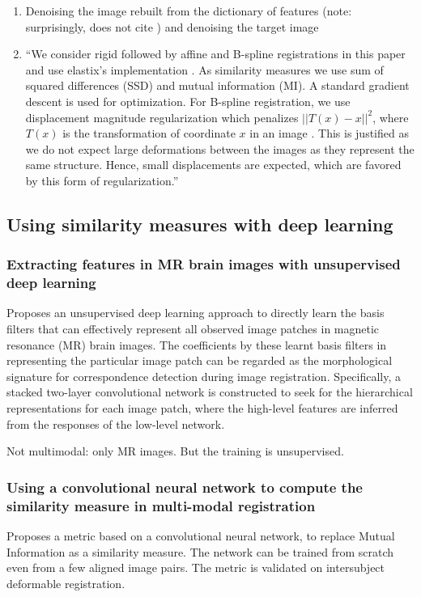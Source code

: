\documentclass[11pt]{article} %
\begin{document}
\begin{enumerate}
  \item Denoising the image rebuilt from the dictionary of features \cite{elad:denoisingdico, li:denoisingdico} (note: surprisingly, \cite{cao:analogies} does not cite \cite{li:denoisingdico}) and denoising the target image
  \item ``We consider rigid followed by affine and B-spline registrations in this paper and use elastix’s implementation \cite{klein:elastix, ibanez:itk}. As similarity measures we use sum of squared differences (SSD) and mutual information
(MI). A standard gradient descent is used for optimization. For B-spline registration, we use displacement
magnitude regularization which penalizes ${||T (x) - x||}^2$,
where $T (x)$ is the transformation of coordinate $x$ in an
image \cite{klein:elastix}. This is justified as we do not
expect large deformations between the images as they
represent the same structure. Hence, small displacements are expected, which are favored by this form of
regularization.'' \cite{cao:analogies}
\end{enumerate}

  \subsection{Using similarity measures with deep learning \cite{litjens:deeplearning}}
    \subsubsection{Extracting features in MR brain images with unsupervised deep learning \linebreak[4] \cite{wu:features} }
Proposes an unsupervised deep learning approach to directly learn the basis filters that can effectively represent all observed image patches in magnetic resonance (MR) brain images. The coefficients by these learnt basis filters in representing the particular image patch can be regarded as the morphological signature for correspondence detection during image registration. Specifically, a stacked two-layer convolutional network is constructed to seek for the hierarchical representations for each image patch, where the high-level features are inferred from the responses of the low-level network.

Not multimodal: only MR images. But the training is unsupervised.

    \subsubsection{Using a convolutional neural network to compute the similarity measure in multi-modal registration \cite{simonovsky:crossmodalfeatures}}
Proposes a metric based on a convolutional neural network, to replace Mutual Information as a similarity measure. The network can be trained from scratch even from a few aligned image pairs. The metric is validated on intersubject deformable registration.
\end{document}

